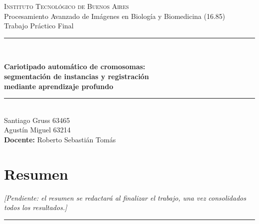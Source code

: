 \documentclass[11pt,a4paper]{article}
\begin{document}
\begin{titlepage}
  \centering
  \vspace*{1.5cm}

  {\Large\scshape Instituto Tecnológico de Buenos Aires}\\[0.4cm]
  {\large Procesamiento Avanzado de Imágenes en Biología y Biomedicina (16.85)}\\[0.2cm]
  {\large Trabajo Práctico Final}\\[2.5cm]

  \rule{\linewidth}{0.5pt}\\[0.6cm]
  {\huge\bfseries Cariotipado automático de cromosomas:\\[0.3cm]
   segmentación de instancias y registración\\[0.3cm]
   mediante aprendizaje profundo\par}
  \vspace{0.6cm}
  \rule{\linewidth}{0.5pt}\\[2.5cm]

  {\large Santiago Gruss 63465}\\[0.15cm]
  {\large Agustín Miguel 63214}\\[2cm]

  {\large\textbf{Docente:} Roberto Sebastián Tomás}\\[2cm]

\end{titlepage}

\section*{Resumen}

\textit{[Pendiente: el resumen se redactará al finalizar el trabajo, una vez
consolidados todos los resultados.]}

\vspace{1.5em}
\hrule
\vspace{1.5em}

\renewcommand{\contentsname}{Índice}
\tableofcontents

\newpage

\end{document}
